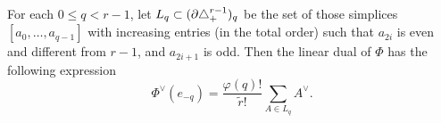 \begin{remark}\label{remark:phidual}
	For each $0\leq q<r-1$, let $L_q\subset (\partial \triangle_{+}^{r-1})_q$ be the set of those simplices $[a_0,\ldots, a_{q-1}]$ with increasing entries (in the total order) such that $a_{2i}$ is even and different from $r-1$, and $a_{2i+1}$ is odd. Then the linear dual of $\Phi$ has the following expression
	\begin{equation}\label{eq:111}
		\Phi^\vee(e_{-q}) = \frac{\varphi(q)!}{\tilde{r}!}\sum_{A\in L_q} A^\vee.
	\end{equation}
\end{remark}